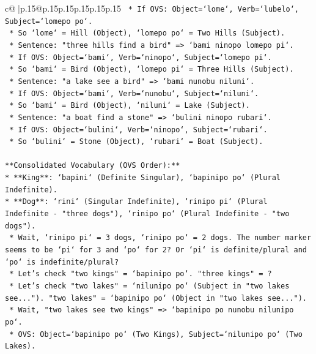 \documentclass{article}
\begin{document}
{\begin{supertabular}{c@{$\;$}|p{.15\linewidth}@{}p{.15\linewidth}p{.15\linewidth}p{.15\linewidth}p{.15\linewidth}p{.15\linewidth}}
{{{\texttt{        *   If OVS: Object=`lome`, Verb=`lubelo`, Subject=`lomepo po`.} \\
\texttt{        *   So `lome` = Hill (Object), `lomepo po` = Two Hills (Subject).} \\
\texttt{    *   Sentence: "three hills find a bird" => `bami ninopo lomepo pi`.} \\
\texttt{        *   If OVS: Object=`bami`, Verb=`ninopo`, Subject=`lomepo pi`.} \\
\texttt{        *   So `bami` = Bird (Object), `lomepo pi` = Three Hills (Subject).} \\
\texttt{    *   Sentence: "a lake see a bird" => `bami nunobu niluni`.} \\
\texttt{        *   If OVS: Object=`bami`, Verb=`nunobu`, Subject=`niluni`.} \\
\texttt{        *   So `bami` = Bird (Object), `niluni` = Lake (Subject).} \\
\texttt{    *   Sentence: "a boat find a stone" => `bulini ninopo rubari`.} \\
\texttt{        *   If OVS: Object=`bulini`, Verb=`ninopo`, Subject=`rubari`.} \\
\texttt{        *   So `bulini` = Stone (Object), `rubari` = Boat (Subject).} \\
\\ 
\texttt{**Consolidated Vocabulary (OVS Order):**} \\
\texttt{*   **King**: `bapini` (Definite Singular), `bapinipo po` (Plural Indefinite).} \\
\texttt{*   **Dog**: `rini` (Singular Indefinite), `rinipo pi` (Plural Indefinite {-} "three dogs"), `rinipo po` (Plural Indefinite {-} "two dogs").} \\
\texttt{    *   Wait, `rinipo pi` = 3 dogs, `rinipo po` = 2 dogs. The number marker seems to be `pi` for 3 and `po` for 2? Or `pi` is definite/plural and `po` is indefinite/plural?} \\
\texttt{    *   Let's check "two kings" = `bapinipo po`. "three kings" = ?} \\
\texttt{    *   Let's check "two lakes" = `nilunipo po` (Subject in "two lakes see..."). "two lakes" = `bapinipo po` (Object in "two lakes see...").} \\
\texttt{        *   Wait, "two lakes see two kings" => `bapinipo po nunobu nilunipo po`.} \\
\texttt{        *   OVS: Object=`bapinipo po` (Two Kings), Subject=`nilunipo po` (Two Lakes).} \\
}}}
\end{supertabular}}
\end{document}
